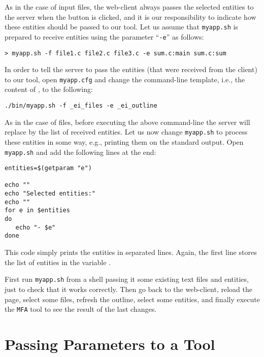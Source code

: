 As in the case of input files, the web-client always passes the
selected entities to the server when the \applybutton button is
clicked, and it is our responsibility to indicate how these entities
should be passed to our tool. 
%
Let us assume that \texttt{myapp.sh} is prepared to receive entities
using the parameter ``\texttt{-e}'' as follows:

\medskip
\begin{lstlisting}
> myapp.sh -f file1.c file2.c file3.c -e sum.c:main sum.c:sum
\end{lstlisting}

\medskip 
\noindent
In order to tell the server to pass the entities (that were received
from the client) to our tool, open \texttt{myapp.cfg} and change the
command-line template, i.e., the content of , to the
following:

\medskip
\begin{lstlisting}
./bin/myapp.sh -f _ei_files -e _ei_outline
\end{lstlisting}

\medskip
\noindent
As in the case of files, before executing the above command-line the
server will replace  by the list of received
entities.  Let us now change \texttt{myapp.sh} to process these
entities in some way, e.g., printing them on the standard output. Open
\texttt{myapp.sh} and add the following lines at the end:

\medskip
\begin{lstlisting}[style=script]
entities=$(getparam "e")

echo ""
echo "Selected entities:"
echo ""
for e in $entities 
do
   echo "- $e"
done
\end{lstlisting}

\medskip
\noindent
This code simply prints the entities in separated lines. Again, the
first line stores the list of entities in the variable
.

First run \texttt{myapp.sh} from a shell passing it some existing text
files and entities, just to check that it works correctly. Then go
back to the web-client, reload the page, select some files, refresh
the outline, select some entities, and finally execute the
\texttt{MFA} tool to see the result of the last changes. 

\section{Passing Parameters to a Tool}


